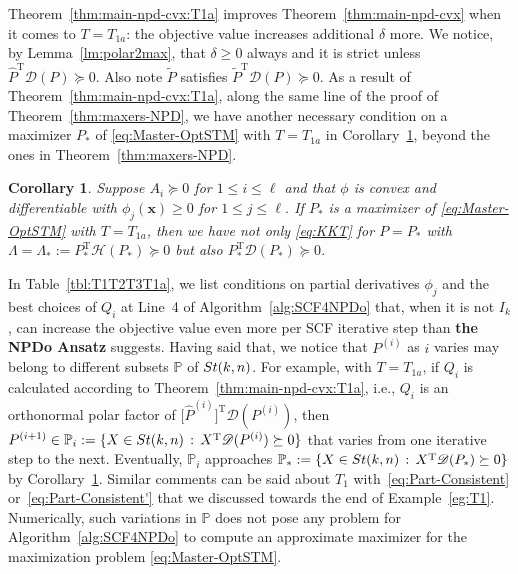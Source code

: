 \documentclass[11pt]{article}
\def\bx{\pmb{x}}
\def\bbP{\mathbb{P}}
\def\scrD{\mathscr{D}}
\def\scrH{\mathscr{H}}
\def\wtd{\widetilde}
\def\what{\widehat}
\newcommand\STM[2]{{\rm St}(#1,#2)}
\DeclareMathOperator{\T}{T}
\def\Blue{\textcolor{blue}}
\newtheorem{corollary}{Corollary}[section]
\theoremstyle{definition}
\numberwithin{equation}{section}
\begin{document}
Theorem~\ref{thm:main-npd-cvx:T1a} improves Theorem~\ref{thm:main-npd-cvx} when it comes to $T=T_{1a}$:
the objective value
increases additional $\delta$ more. We notice, by Lemma~\ref{lm:polar2max},
that $\delta\ge 0$ always and it is strict
unless $\what P^{\T}\scrD(P)\succeq 0$.
Also note $\wtd P$ satisfies
$\wtd P^{\T}\scrD(P)\succeq 0$.
%
As a result of Theorem~\ref{thm:main-npd-cvx:T1a}, along the same line of the proof of Theorem~\ref{thm:maxers-NPD},
we have another necessary condition on a maximizer $P_*$ of \eqref{eq:Master-OptSTM} with $T=T_{1a}$
in Corollary~\ref{cor:T1a}, beyond the ones in
Theorem~\ref{thm:maxers-NPD}.

\begin{corollary}\label{cor:T1a}
Suppose $A_i\succeq 0$ for $1\le i\le\ell$ and that $\phi$ is convex and differentiable with
$\phi_j(\bx)\ge 0$ for $1\le j\le\ell$. If $P_*$ is a  maximizer of \eqref{eq:Master-OptSTM} with $T=T_{1a}$, then we
have not only \eqref{eq:KKT} for $P=P_*$ with $\Lambda=\Lambda_*:=P_*^{\T}\scrH(P_*)\succeq 0$
but also $P_*^{\T}\scrD(P_*)\succeq 0$.
\end{corollary}





In Table~\ref{tbl:T1T2T3T1a}, we list conditions on partial derivatives $\phi_j$
and the best choices of $Q_i$ at Line~4 of Algorithm~\ref{alg:SCF4NPDo}
that, when it is not $I_k$, can increase the objective value even more per SCF iterative step than {\bf the NPDo Ansatz} suggests.
Having said that, we notice that $P^{(i)}$ as $i$ varies may belong to different subsets $\bbP$ of
$\STM{k}{n}$. For example, with $T=T_{1a}$, if $Q_i$ is calculated according to Theorem~\ref{thm:main-npd-cvx:T1a}, i.e., $Q_i$ is an orthonormal polar factor of $\big[\what P^{(i)}\big]^{\T}\scrD(P^{(i)})$,
then $P^{(i+1)}\in\bbP_i:=\{X\in\STM{k}{n}\,:\, X^{\T}\scrD(P^{(i)})\succeq 0\}$ that varies from one iterative step to the next. Eventually,
$\bbP_i$ approaches $\bbP_*:=\{X\in\STM{k}{n}\,:\, X^{\T}\scrD(P_*)\succeq 0\}$ by
Corollary~\ref{cor:T1a}.
Similar comments can be said about $T_1$ with~\eqref{eq:Part-Consistent} or~\eqref{eq:Part-Consistent'} that we discussed
towards the end of Example~\ref{eg:T1}.
Numerically, such variations in $\bbP$ does not pose any problem for Algorithm~\ref{alg:SCF4NPDo}
to compute an approximate maximizer for the maximization problem \eqref{eq:Master-OptSTM}.
\end{document}
